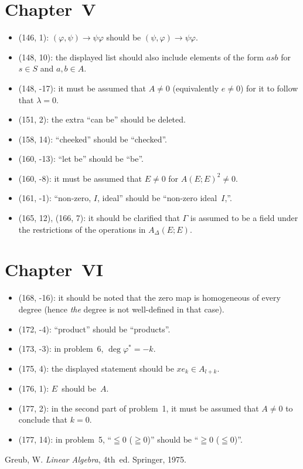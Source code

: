 \documentclass[letterpaper,12pt]{article}
\begin{document}
\section*{Chapter~V}
\begin{itemize}
\item (146, 1): \((\varphi,\psi)\to\psi\varphi\) should be \((\psi,\varphi)\to\psi\varphi\).
\item (148, 10): the displayed list should also include elements of the form \(asb\) for \(s\in S\) and \(a,b\in A\).
\item (148, -17): it must be assumed that \(A\ne 0\) (equivalently \(e\ne 0\)) for it to follow that \(\lambda=0\).
\item (151, 2): the extra ``can be'' should be deleted.
\item (158, 14): ``cheeked'' should be ``checked''.
\item (160, -13): ``let be'' should be ``be''.
\item (160, -8): it must be assumed that \(E\ne 0\) for \(A(E;E)^2\ne 0\).
\item (161, -1): ``non-zero, \(I\), ideal'' should be ``non-zero ideal~\(I\),''.
\item (165, 12), (166, 7): it should be clarified that \(\Gamma\) is assumed to be a field under the restrictions of the operations in \(A_{\Delta}(E;E)\).
\end{itemize}

\section*{Chapter~VI}
\begin{itemize}
\item (168, -16): it should be noted that the zero map is homogeneous of every degree (hence \emph{the} degree is not well-defined in that case).
\item (172, -4): ``product'' should be ``products''.
\item (173, -3): in problem~6, \(\deg\varphi^*=-k\).
\item (175, 4): the displayed statement should be \(xe_k\in A_{l+k}\).
\item (176, 1): \(E\)~should be~\(A\).
\item (177, 2): in the second part of problem~1, it must be assumed that \(A\ne 0\) to conclude that \(k=0\).
\item (177, 14): in problem~5, ``\(\leqq 0\) (\(\geqq 0\))'' should be ``\(\geqq 0\) (\(\leqq 0\))''.
\end{itemize}

\begin{thebibliography}{0}
 Greub, W. \textit{Linear Algebra}, 4th~ed. Springer, 1975.
\end{thebibliography}
\end{document}
